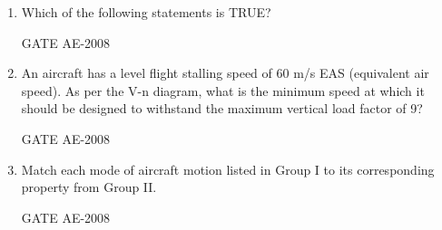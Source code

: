\documentclass[journal,12pt,onecolumn]{IEEEtran}
\theoremstyle{remark}
\begin{document}
\begin{enumerate}
    \quad

 \item Which of the following statements is TRUE?\\
    \begin{enumerate}
    \end{enumerate}
    \hfill{GATE AE-2008}

    \quad

 \item An aircraft has a level flight stalling speed of 60 m/s EAS (equivalent air speed). As per the V-n diagram, what is the minimum speed at which it should be designed to withstand the maximum vertical load factor of 9?\\
    \begin{enumerate}
    \end{enumerate}
    \hfill{GATE AE-2008}

    \quad

    \item  Match each mode of aircraft motion listed in Group I to its corresponding property from Group II.\\


    \begin{enumerate}
    \end{enumerate}
    \hfill{GATE AE-2008}


\end{enumerate}
\end{document}
